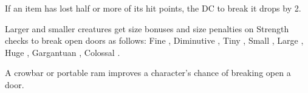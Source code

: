 If an item has lost half or more of its hit points, the DC to break it drops by 2.

Larger and smaller creatures get size bonuses and size penalties on Strength checks to break open doors as follows: Fine , Diminutive , Tiny , Small , Large , Huge , Gargantuan , Colossal .

A crowbar or portable ram improves a character's chance of breaking open a door.